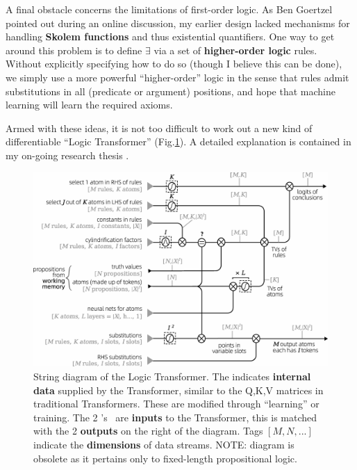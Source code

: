 \documentclass[runningheads]{llncs}
\begin{document}
A final obstacle concerns the limitations of first-order logic.  As Ben Goertzel pointed out during an online discussion, my earlier design lacked mechanisms for handling \textbf{Skolem functions} and thus existential quantifiers.  One way to get around this problem is to define $\exists$ via a set of \textbf{higher-order logic} rules.  Without explicitly specifying how to do so (though I believe this can be done), we simply use a more powerful ``higher-order'' logic in the sense that rules admit substitutions in all (predicate or argument) positions, and hope that machine learning will learn the required axioms.

Armed with these ideas, it is not too difficult to work out a new kind of differentiable ``Logic Transformer'' (Fig.\ref{fig:string-diagram}).  A detailed explanation is contained in my on-going research thesis \cite{YKY}.

\begin{figure}
	\hspace{-3cm}
	\includegraphics[scale=.7]{logic-Transformer-string-diagram-3.png}
	\caption{String diagram of the Logic Transformer.  The {\LARGE\color{gray}\RIGHTarrow} indicates \textbf{internal data} supplied by the Transformer, similar to the Q,K,V matrices in traditional Transformers.  These are modified through ``learning'' or training.  The 2 \RIGHTarrow's \ are \textbf{inputs} to the Transformer, this is matched with the 2 \textbf{outputs} on the right of the diagram.  Tags {\color{gray}$[M,N,...]$} indicate the \textbf{dimensions} of data streams.  {\color{red}NOTE:  diagram is obsolete as it pertains only to fixed-length propositional logic.}}
	\label{fig:string-diagram}
\end{figure}
\end{document}
